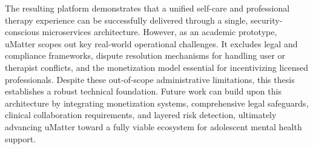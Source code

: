 The resulting platform demonstrates that a unified self-care and professional therapy experience can be successfully delivered through a single, security-conscious microservices architecture. However, as an academic prototype, uMatter scopes out key real-world operational challenges. It excludes legal and compliance frameworks, dispute resolution mechanisms for handling user or therapist conflicts, and the monetization model essential for incentivizing licensed professionals. Despite these out-of-scope administrative limitations, this thesis establishes a robust technical foundation. Future work can build upon this architecture by integrating monetization systems, comprehensive legal safeguards, clinical collaboration requirements, and layered risk detection, ultimately advancing uMatter toward a fully viable ecosystem for adolescent mental health support.